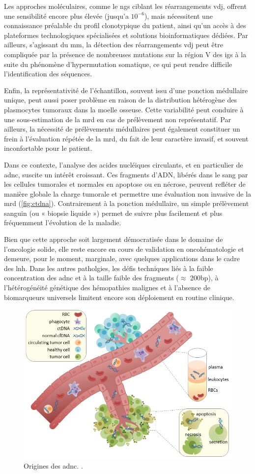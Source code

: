 Les approches moléculaires, comme le \gls{ngs} ciblant les réarrangements \gls{vdj}, offrent une sensibilité encore plus élevée (jusqu'a $10^{-6}$),
mais nécessitent une connaissance préalable du profil clonotypique du patient, ainsi qu'un accès à des plateformes technologiques spécialisées et solutions 
bioinformatiques dédiées. Par ailleurs, s'agissant du \gls{mm}, la détection des réarrangements \gls{vdj} peut être compliquée par la présence de nombreuses 
mutations sur la région V des \glspl{ig} à la suite du phénomène d'hypermutation somatique, ce qui peut rendre difficile l'identification des séquences.

Enfin, la représentativité de l'échantillon, souvent issu d'une ponction médullaire unique, peut aussi poser problème en raison de la distribution hétérogène
des plasmocytes tumoraux dans la moelle osseuse. Cette variabilité peut conduire à une sous-estimation de la \gls{mrd} en cas de prélèvement non représentatif.
Par ailleurs, la nécessité de prélèvements médullaires peut également constituer un frein à l'évaluation répétée de la \gls{mrd}, du fait de leur caractère
invasif, et souvent inconfortable pour le patient.

Dans ce contexte, l'analyse des acides nucléiques circulants, et en particulier de \gls{adnc}, suscite un intérêt croissant. Ces fragments d'ADN, libérés dans le sang 
par les cellules tumorales et normales en apoptose ou en nécrose, peuvent refléter de manière globale la charge tumorale et permettre une évaluation non 
invasive de la \gls{mrd} (\autoref{fig:ctdna}). Contrairement à la ponction médullaire, un simple prélèvement sanguin (ou « biopsie liquide ») permet de suivre plus facilement 
et plus fréquemment l'évolution de la maladie.

Bien que cette approche soit largement démocratisée dans le domaine de l'oncologie solide, elle reste encore en cours de validation en oncohématologie et demeure,
pour le moment, marginale, avec quelques applications dans le cadre des \gls{lnh}. Dans les autres patholgies, les défis techniques liés à la faible concentration des 
\gls{adnc} et à la taille faible des fragments ($\approx$ 200bp), à l'hétérogénéité génétique des hémopathies malignes et à l'absence de biomarqueurs universels 
limitent encore son déploiement en routine clinique.

\begin{figure}[H]
    \includegraphics[width=1\textwidth]{images/ctdna.png}
    \caption{Origines des \gls{adnc}. \citeauthor{racheljunewongEnglishCirculatingTumor2017} \cite{racheljunewongEnglishCirculatingTumor2017}.}
    \label{fig:ctdna}
\end{figure}
    
